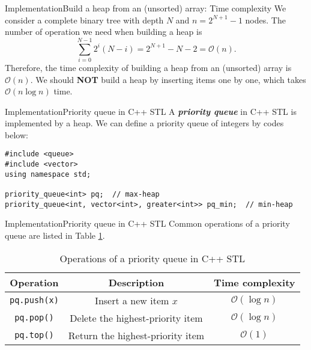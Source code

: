 \documentclass[aspectratio=169]{ctexbeamer}
\newcommand{\highlight}[1]{\textbf{\textit{#1}}}
\begin{document}
    \begin{frame}{Implementation}{Build a heap from an (unsorted) array: Time complexity}
        We consider a complete binary tree with depth $N$ and $n=2^{N+1}-1$ nodes. The number of operation we need when building a heap is
        $$\sum_{i=0}^{N-1}2^i(N-i)=2^{N+1}-N-2=\mathcal O(n).$$
        Therefore, the time complexity of building a heap from an (unsorted) array is $\mathcal O(n)$. We should {\bf NOT} build a heap by inserting items one by one, which takes $\mathcal O(n\log n)$ time.
    \end{frame}

    \begin{frame}[fragile]{Implementation}{Priority queue in C++ STL}
        A \highlight{priority queue} in C++ STL is implemented by a heap. We can define a priority queue of integers by codes below:
        {\small
        \begin{lstlisting}
#include <queue>
#include <vector>
using namespace std;

priority_queue<int> pq;  // max-heap
priority_queue<int, vector<int>, greater<int>> pq_min;  // min-heap
        \end{lstlisting}}
    \end{frame}

    \begin{frame}{Implementation}{Priority queue in C++ STL}
        Common operations of a priority queue are listed in Table \ref{tab:Operations of a priority queue in C++ STL}.

        \begin{table}[!htbp]
            \centering
            \begin{tabular}{ccc}
                \toprule
                Operation & Description & Time complexity \\
                \midrule
                \texttt{pq.push(x)} & Insert a new item $x$ & $\mathcal O(\log n)$ \\
                \texttt{pq.pop()} & Delete the highest-priority item & $\mathcal O(\log n)$ \\
                \texttt{pq.top()} & Return the highest-priority item & $\mathcal O(1)$ \\
                \bottomrule
            \end{tabular}
            \caption{Operations of a priority queue in C++ STL}
            \label{tab:Operations of a priority queue in C++ STL}
        \end{table}
    \end{frame}
\end{document}
